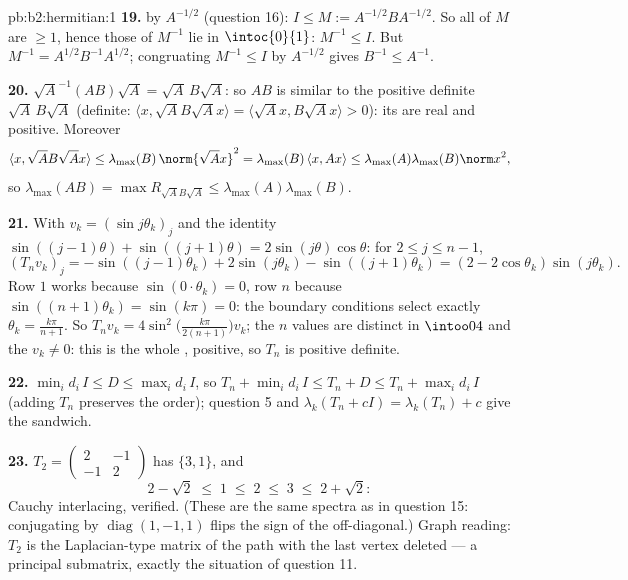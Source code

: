 \begin{solution}{pb:b2:hermitian:1}
\textbf{19.}  by $A^{-1/2}$ (question 16): $I \leq M
:= A^{-1/2}BA^{-1/2}$. So all  of $M$ are $\geq 1$,
hence those of $M^{-1}$ lie in $\intoc{0}{1}$: $M^{-1} \leq I$.
But $M^{-1} = A^{1/2}B^{-1}A^{1/2}$; congruating $M^{-1} \leq
I$ by $A^{-1/2}$ gives $B^{-1} \leq A^{-1}$.

\textbf{20.} $\sqrt A^{-1}(AB)\sqrt A = \sqrt A\,B\sqrt A$: so
$AB$ is similar to the  positive definite $\sqrt
A\,B\sqrt A$ (definite: $\langle x, \sqrt AB\sqrt Ax\rangle =
\langle \sqrt Ax, B\sqrt Ax\rangle > 0$): its  are
real and positive. Moreover
\[
\langle x, \sqrt AB\sqrt Ax\rangle
\leq \lambda_{\max}(B)\,\norm{\sqrt Ax}^2
= \lambda_{\max}(B)\,\langle x, Ax\rangle
\leq \lambda_{\max}(A)\lambda_{\max}(B)\norm x^2 ,
\]
so $\lambda_{\max}(AB) = \max R_{\sqrt AB\sqrt A} \leq
\lambda_{\max}(A)\lambda_{\max}(B)$.

\textbf{21.} With $v_k = (\sin j\theta_k)_j$ and the identity
$\sin((j-1)\theta) + \sin((j+1)\theta) =
2\sin(j\theta)\cos\theta$: for $2 \leq j \leq n-1$,
\[
(T_nv_k)_j = -\sin((j{-}1)\theta_k) + 2\sin(j\theta_k) -
\sin((j{+}1)\theta_k)
= (2 - 2\cos\theta_k)\sin(j\theta_k) .
\]
Row $1$ works because $\sin(0\cdot\theta_k) = 0$, row $n$
because $\sin((n+1)\theta_k) = \sin(k\pi) = 0$: the boundary
conditions select exactly $\theta_k = \frac{k\pi}{n+1}$. So
$T_nv_k = 4\sin^2\bigl(\frac{k\pi}{2(n+1)}\bigr)v_k$; the $n$
values are distinct in $\intoo04$ and the $v_k \neq 0$: this is
the whole , positive, so $T_n$ is positive definite.

\textbf{22.} $\min_id_i\,I \leq D \leq \max_id_i\,I$, so $T_n +
\min_id_i\,I \leq T_n + D \leq T_n + \max_id_i\,I$
(adding $T_n$ preserves the order); question 5 and
$\lambda_k(T_n + cI) = \lambda_k(T_n) + c$ give the sandwich.

\textbf{23.} $T_2 = \begin{pmatrix} 2 & -1\\ -1 &
2\end{pmatrix}$ has  $\{3, 1\}$, and
\[
2 - \sqrt2 \;\leq\; 1 \;\leq\; 2 \;\leq\; 3 \;\leq\; 2 +
\sqrt2 :
\]
Cauchy interlacing, verified. (These are the same spectra as in
question 15: conjugating by $\operatorname{diag}(1,-1,1)$ flips
the sign of the off-diagonal.) Graph reading: $T_2$ is the
Laplacian-type matrix of the path with the last vertex deleted
--- a principal submatrix, exactly the situation of question
11.


\end{solution}
